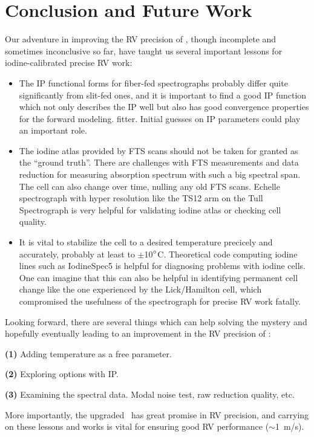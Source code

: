 


 

 
\section{Conclusion and Future Work}\label{het:sec:conclusion}
 
Our adventure in improving the RV precision of \het, though incomplete
and sometimes inconclusive so far, have taught us several important
lessons for iodine-calibrated precise RV work:

\begin{itemize}
  \item The IP functional forms for fiber-fed spectrographs probably
differ quite significantly from slit-fed ones, and it is important to
find a good IP function which not only describes the IP well but also
has good convergence properties for the forward modeling.
fitter. Initial guesses on IP parameters could play an important role.
  \item The iodine atlas provided by FTS scans should not be taken for
granted as the ``ground truth''. There are challenges with FTS
measurements and data reduction for measuring absorption spectrum with
such a big spectral span. The cell can also change over time, nulling
any old FTS scans. Echelle spectrograph with hyper resolution like the
TS12 arm on the Tull Spectrograph is very helpful for validating
iodine atlas or checking cell quality.
  \item It is vital to stabilize the cell to a desired temperature
precicely and accurately, probably at least to
$\pm$10$^{\circ}$C. Theoretical code computing iodine lines such as
IodineSpec5 is helpful for diagnosing problems with iodine cells. One
can imagine that this can also be helpful in identifying permanent
cell change like the one experienced by the Lick/Hamilton cell, which
compromised the usefulness of the spectrograph for precise RV work
fatally.
\end{itemize}

Looking forward, there are several things which can help solving the
mystery and hopefully eventually leading to an improvement in the RV
precision of \het:

{\bf (1)} Adding temperature as a free parameter.

{\bf (2)} Exploring options with IP.

{\bf (3)} Examining the spectral data. Modal noise test, raw reduction
quality, etc.

More importantly, the upgraded \het\ has great promise in RV
precision, and carrying on these lessons and works is vital for
ensuring good RV performance ($\sim$1~m/s). 



